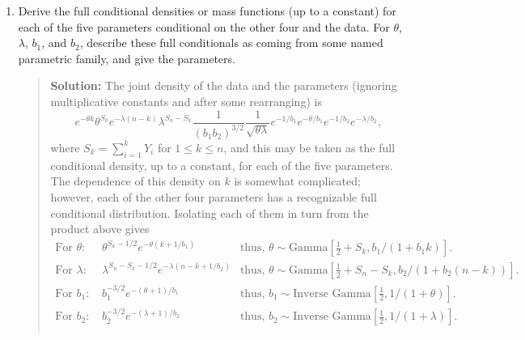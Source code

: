 \documentclass{article}
\begin{document}
\begin{enumerate}
\begin{enumerate}
    \item Derive the full conditional densities or mass functions (up to a
    constant) for each of the five parameters conditional on the other four and
    the data. For $\theta$, $\lambda$, $b_1$, and $b_2$, describe these full
    conditionals as coming from some named parametric family, and give the
    parameters.
    \begin{quotation}{\bf Solution:}
    The joint density of the data and the parameters (ignoring multiplicative constants
    and after some rearranging) is
    \[
    e^{-\theta k}\theta^{S_k}
    e^{-\lambda(n-k)}\lambda^{S_n-S_k}
    \frac{1}{(b_1b_2)^{3/2}} \frac{1}{\sqrt{\theta\lambda}} 
    e^{-1/b_1} e^{-\theta/b_1}
    e^{-1/b_2} e^{-\lambda/b_2},
    \]
    where $S_k=\sum_{i=1}^k Y_i$ for $1\le k \le n$,
    and this may be taken as the full conditional density, up to a constant, for each of the
    five parameters.
    The dependence of this density on $k$ is somewhat complicated; however, each of the
    other four parameters has a recognizable full conditional distribution.  Isolating each
    of them in turn from the product above gives
    \begin{eqnarray*}
    \mbox{For $\theta$:  } & \theta^{S_k - 1/2}
    e^{-\theta(k+1/b_1)}& 
    \mbox{thus, $\theta\sim \mbox{Gamma}\left[ \frac12+S_k, b_1/(1+b_1k) \right]$.} \\
    \mbox{For $\lambda$:  } & \lambda^{S_n-S_k - 1/2}
    e^{-\lambda(n-k+1/b_2)}& 
    \mbox{thus, $\theta\sim \mbox{Gamma}\left[ \frac12+S_n-S_k, 
    b_2/(1+b_2(n-k)) \right]$.} \\
    \mbox{For $b_1$:  } & b_1^{-3/2} e^{-(\theta+1)/b_1} & \mbox{thus, $b_1\sim
    \mbox{Inverse Gamma}\left[  \frac12, 1/(1+\theta) \right] $.} \\
    \mbox{For $b_2$:  } & b_2^{-3/2} e^{-(\lambda+1)/b_2} & \mbox{thus, $b_2\sim
    \mbox{Inverse Gamma}\left[  \frac12, 1/(1+\lambda) \right] $.} \\
    \end{eqnarray*}
    \end{quotation}
    

\end{enumerate}
\end{enumerate}
\end{document}
